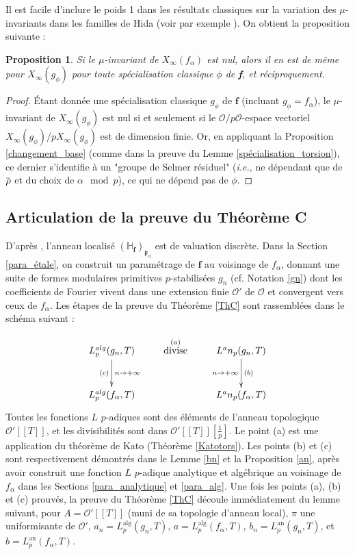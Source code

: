 \documentclass[12pt]{amsart}
\newcommand\bH{\mathbb{H}}
\newcommand\cO{\mathcal{O}}
\newcommand\gp{\mathfrak{p}}
\newcommand{\ob}[1]{\mkern 1.5mu\overline{\mkern-1.5mu#1\mkern-1.5mu}\mkern 1.5mu}
\newcommand{\an}{\textrm{an}}
\newcommand{\alg}{\textrm{alg}}
\theoremstyle{defstyle}
\theoremstyle{thmstyle}
\newtheorem{proposition}[subsubsection]{Proposition}
\begin{document}
Il est facile d'inclure le poids 1 dans les résultats classiques sur la variation des $\mu$-invariants dans les familles de Hida (voir par exemple \cite[Theorem 4.3.3]{emerton2006variation}). On obtient la proposition suivante :

\begin{proposition}\label{prop:mu=0}
	Si le $\mu$-invariant de $X_\infty(f_\alpha)$ est nul, alors il en est de même pour $X_\infty(g_\phi)$ pour toute spécialisation classique $\phi$ de \textbf{f}, et réciproquement.
\end{proposition}
\begin{proof}
	\'Etant donnée une spécialisation classique $g_\phi$ de $\textbf{f}$ (incluant $g_\phi=f_\alpha$), le $\mu$-invariant de $X_\infty(g_\phi)$ est nul si et seulement si le $\cO/p\cO$-espace vectoriel $X_\infty(g_\phi)/pX_\infty(g_\phi)$ est de dimension finie. Or, en appliquant la Proposition \ref{changement_base} (comme dans la preuve du Lemme \ref{spécialisation_torsion}), ce dernier s'identifie à un "groupe de Selmer résiduel" (\textit{i.e.}, ne dépendant que de $\ob{\rho}$ et du choix de $\alpha \mod p$), ce qui ne dépend pas de $\phi$.
\end{proof}

\subsection{Articulation de la preuve du Théorème C}

D'après \cite[§7.3, Proposition 1.12]{dimitrov2014local}, l'anneau localisé $\left(\bH_\textbf{f}\right)_{\gp_\alpha}$ est de valuation discrète. Dans la Section \ref{para_étale}, on construit un paramétrage de $\textbf{f}$ au voisinage de $f_\alpha$, donnant une suite de formes modulaires primitives $p$-stabilisées $g_n$ (cf. Notation \ref{gn}) dont les coefficients de Fourier vivent dans une extension finie $\cO'$ de $\cO$ et convergent vers ceux de $f_\alpha$. Les étapes de la preuve du Théorème \ref{ThC} sont rassemblées dans le schéma suivant : 

$$
\xymatrix{
	L_p^{\alg}(g_n,T) \ar[d]_{(c)}^{n \rightarrow +\infty} & \stackrel{(a)}{\mbox{divise}} & L^\an_p(g_n,T) \ar[d]^{(b)}_{n \rightarrow +\infty} \\
	L_p^{\alg}(f_\alpha,T) & & L^\an_p(f_\alpha,T) 
}
$$ 
Toutes les fonctions $L$ $p$-adiques sont des éléments de l'anneau topologique $\cO'[[T]]$, et les divisibilités sont dans $\cO'[[T]][\tfrac{1}{p}]$. Le point (a) est une application du théorème de Kato (Théorème \ref{Katotors}). Les points (b) et (c) sont respectivement démontrés dans le Lemme \ref{bn} et la Proposition \ref{an}, après avoir construit une fonction $L$ $p$-adique analytique et algébrique au voisinage de $f_\alpha$ dans les Sections \ref{para_analytique} et \ref{para_alg}. Une fois les points (a), (b) et (c) prouvés, la preuve du Théorème \ref{ThC} découle immédiatement du lemme suivant, pour $A=\cO'[[T]]$ (muni de sa topologie d'anneau local), $\pi$ une uniformisante de $\cO'$, $a_n=L_p^{\alg}(g_n,T)$, $a=L_p^{\alg}(f_\alpha,T)$, $b_n=L^\an_p(g_n,T)$, et $b=L^\an_p(f_\alpha,T)$.
\end{document}
